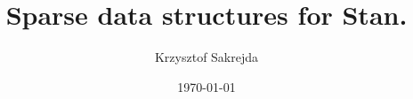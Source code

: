 \documentclass[letterpaper,11pt,oneside,article]{memoir}
\title{Sparse data structures for Stan.}
\author{Krzysztof Sakrejda}
\date{\today}  %
\begin{document}
\maketitle %

\clearpage
\tableofcontents



\linenumbers











%
%
\printbibliography 
\end{document}
